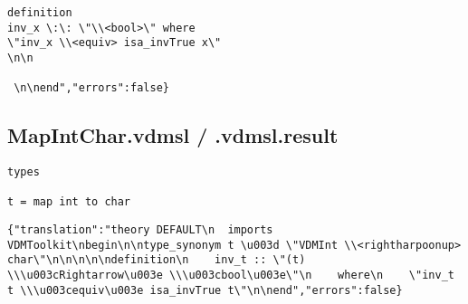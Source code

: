 \begin{appendices}
\begin{lstlisting}
definition
inv_x \:\: \"\\<bool>\" where
\"inv_x \\<equiv> isa_invTrue x\"
\n\n

 \n\nend","errors":false}
\end{lstlisting}

\subsection{MapIntChar.vdmsl / .vdmsl.result} \label{mapintchar}
\begin{lstlisting}
types

t = map int to char
\end{lstlisting}

\begin{lstlisting}
{"translation":"theory DEFAULT\n  imports VDMToolkit\nbegin\n\ntype_synonym t \u003d \"VDMInt \\<rightharpoonup> char\"\n\n\n\n\ndefinition\n    inv_t :: \"(t) \\\u003cRightarrow\u003e \\\u003cbool\u003e\"\n    where\n    \"inv_t t \\\u003cequiv\u003e isa_invTrue t\"\n\nend","errors":false}
\end{lstlisting}

\begin{lstlisting}

\end{lstlisting}

\begin{lstlisting}

\end{lstlisting}

\begin{lstlisting}

\end{lstlisting}

\begin{lstlisting}

\end{lstlisting}

\begin{lstlisting}

\end{lstlisting}

\begin{lstlisting}

\end{lstlisting}




\end{appendices}
